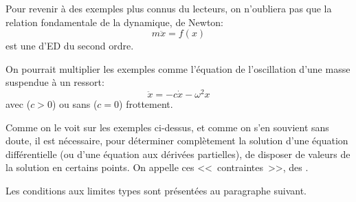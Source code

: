 \medskip
Pour revenir à des exemples plus connus du lecteurs, on n'oubliera pas que
la relation fondamentale de la dynamique, de Newton: \begin{equation} %
m\ddot{x}=f(x)\end{equation}%
est une d'ED du second ordre.

On pourrait multiplier les exemples comme l'équation de l'oscillation d'une masse
suspendue à un ressort: \begin{equation}%
\ddot{x} = - c \dot{x} - \omega^2x \end{equation}%
avec ($c>0$) ou sans ($c=0$) frottement.

\medskip
Comme on le voit sur les exemples ci-dessus, et comme on s'en souvient sans doute,
il est nécessaire, pour déterminer complètement la solution d'une équation différentielle (ou d'une équation aux dérivées partielles),
de disposer de valeurs de la solution en certains points.
On appelle ces <<~contraintes~>>, des .

Les conditions aux limites types sont présentées au paragraphe suivant.


